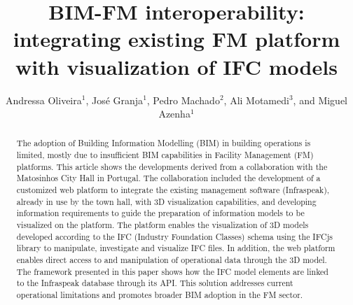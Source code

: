 \documentclass[a4paper, 10pt, twocolumn, twoside]{article}
\begin{document}
\linespread{0.5}

\title{BIM-FM interoperability: integrating existing FM platform with visualization of IFC models}

\author{Andressa Oliveira$^{1}$, José Granja$^1$, Pedro Machado$^2$, Ali Motamedi$^3$, and Miguel Azenha$^1$}




\maketitle 
\thispagestyle{fancy} 
\pagestyle{fancy}

\begin{abstract}
The adoption of Building Information Modelling (BIM) in building operations is limited, mostly due to insufficient BIM capabilities in Facility Management (FM) platforms. This article shows the developments derived from a collaboration with the Matosinhos City Hall in Portugal. The collaboration included the development of a customized web platform to integrate the existing management software (Infraspeak), already in use by the town hall, with 3D visualization capabilities, and developing information requirements to guide the preparation of information models to be visualized on the platform. The platform enables the visualization of 3D models developed according to the IFC (Industry Foundation Classes) schema using the IFCjs library to manipulate, investigate and visualize IFC files. In addition, the web platform enables direct access to and manipulation of operational data through the 3D model. The framework presented in this paper shows how the IFC model elements are linked to the Infraspeak database through its API. This solution addresses current operational limitations and promotes broader BIM adoption in the FM sector.
\end{abstract}
\end{document}

